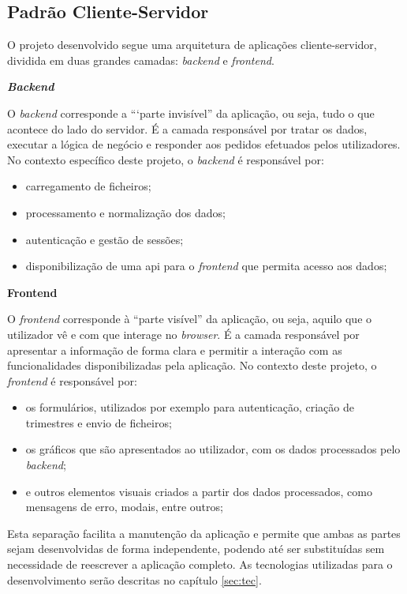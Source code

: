 \subsection{Padrão Cliente-Servidor}

O projeto desenvolvido segue uma arquitetura de aplicações cliente-servidor, dividida em duas grandes camadas: \textit{backend} e \textit{frontend}.

\textbf{\textit{Backend}}

O \textit{backend} corresponde a ```parte invisível” da aplicação, ou seja, tudo o que acontece do lado do servidor. É a camada responsável por tratar os dados, executar a lógica de negócio e responder aos pedidos efetuados pelos utilizadores. No contexto específico deste projeto, o \textit{backend} é responsável por:

\begin{itemize}
    \item carregamento de ficheiros;
    \item processamento e normalização dos dados;
    \item autenticação e gestão de sessões;
    \item disponibilização de uma \gls{api} para o \textit{frontend} que permita acesso aos dados;
\end{itemize}

\textbf{Frontend}

O \textit{frontend} corresponde à ``parte visível'' da aplicação, ou seja, aquilo que o utilizador vê e com que interage no \textit{browser}. É a camada responsável por apresentar a informação de forma clara e permitir a interação com as funcionalidades disponibilizadas pela aplicação. No contexto deste projeto, o \textit{frontend} é responsável por:
\begin{itemize}
    \item os formulários, utilizados por exemplo para autenticação, criação de trimestres e envio de ficheiros;
    \item os gráficos que são apresentados ao utilizador, com os dados processados pelo \textit{backend};
    \item e outros elementos visuais criados a partir dos dados processados, como mensagens de erro, modais, entre outros;
\end{itemize}

Esta separação facilita a manutenção da aplicação e permite que ambas as partes sejam desenvolvidas de forma independente, podendo até ser substituídas sem necessidade de reescrever a aplicação completo. As tecnologias utilizadas para o desenvolvimento serão descritas no capítulo \ref{sec:tec}.

